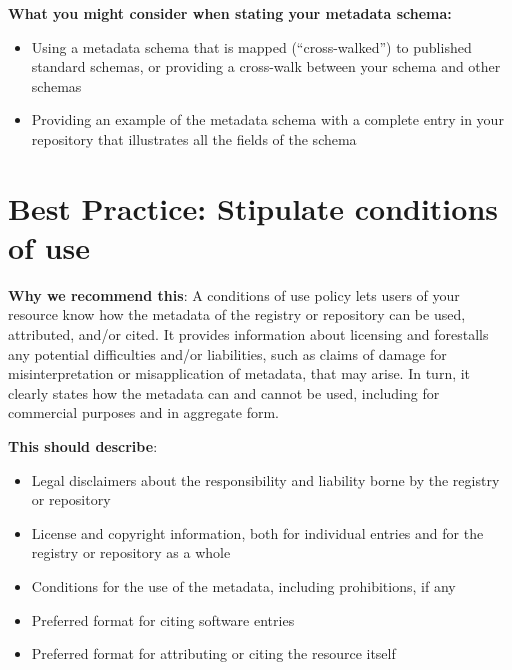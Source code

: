 \documentclass[11pt]{article}
\begin{document}
\textbf{What you might consider when stating your metadata schema:}

\begin{itemize}
\item Using a metadata schema that is mapped (``cross-walked'') to published standard schemas, or providing a cross-walk between your schema and other schemas

\item Providing an example of the metadata schema with a complete entry in your repository that illustrates all the fields of the schema

\end{itemize}


\section{Best Practice: Stipulate conditions of use}
\label{best-practice-stipulate-conditions-of-use}

\textbf{Why we recommend this}: A conditions of use policy lets users of your resource know how the metadata of the registry or repository can be used, attributed, and/or cited. It provides information about licensing and forestalls any potential difficulties and/or liabilities, such as claims of damage for misinterpretation or misapplication of metadata, that may arise. In turn, it clearly states how the metadata can and cannot be used, including for commercial purposes and in aggregate form.

\textbf{This should describe}:

\begin{itemize}
\item Legal disclaimers about the responsibility and liability borne by the registry or repository

\item License and copyright information, both for individual entries and for the registry or repository as a whole

\item Conditions for the use of the metadata, including prohibitions, if any

\item Preferred format for citing software entries

\item Preferred format for attributing or citing the resource itself

\end{itemize}
\end{document}
